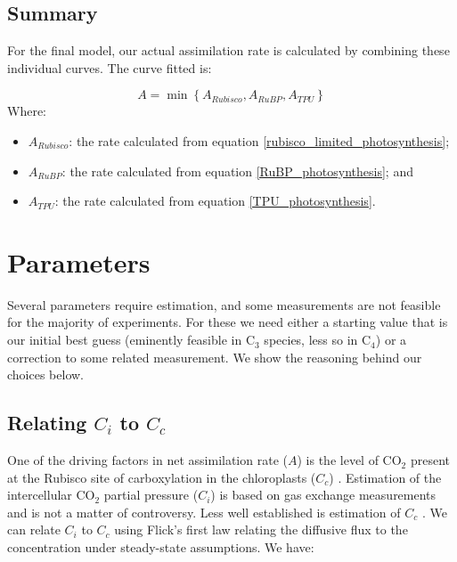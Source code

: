 \documentclass[11pt]{article} %
\begin{document}
\subsection{Summary}
For the final model, our actual assimilation rate is calculated by combining these individual curves. The curve fitted is:

\begin{equation} \label{FvCB_equation}
A = \min \left \{A_{Rubisco}, A_{RuBP}, A_{TPU}\right \}
\end{equation}
Where:
\begin{itemize}
 \item $A_{Rubisco}$: the rate calculated from equation \ref{rubisco_limited_photosynthesis};
 \item $A_{RuBP}$: the rate calculated from equation \ref{RuBP_photosynthesis}; and
 \item $A_{TPU}$: the rate calculated from equation \ref{TPU_photosynthesis}.
\end{itemize}

\section{Parameters}
Several parameters require estimation, and some measurements are not feasible for the majority of experiments. For these we need either a starting value that is our initial best guess (eminently feasible in C$_3$ species, less so in C$_4$) or a correction to some related measurement. We show the reasoning behind our choices below.

\subsection{Relating $C_i$ to $C_c$}
One of the driving factors in net assimilation rate ($A$) is the level of CO$_2$ present at the Rubisco site of carboxylation in the chloroplasts ($C_c$) \cite{VonCaemmererSteadystatemodelsphotosynthesis2013}. Estimation of the intercellular CO$_2$ partial pressure ($C_i$) is based on gas exchange measurements and is not a matter of controversy. Less well established is estimation of $C_c$ \cite{YinTheoreticalreconsiderationswhen2009}.  We can relate $C_i$ to $C_c$ using Flick's first law relating the diffusive flux to the concentration  under steady-state assumptions. We have:
\end{document}
